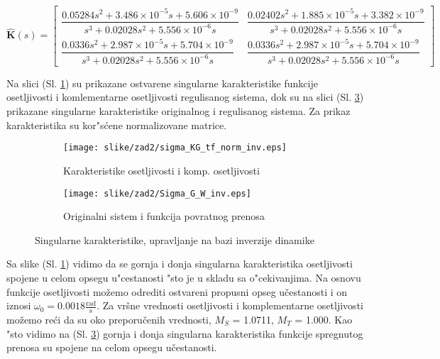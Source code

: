 \documentclass[a4paper,11pt]{article}
\theoremstyle{definition} \newtheorem{deff}{Definicija}[section]
\theoremstyle{definition} \newtheorem{prim}[deff]{Primer}
\theoremstyle{plain} \newtheorem{teor}[deff]{Teorema}
\begin{document}
			
			\begin{equation}
				\hat{\textbf{K}}(s) = \begin{bmatrix} \dfrac{{0.05284s^2 + 3.486 \times 10^{-5}s + 5.606 \times 10^{-9}}}{{s^3 + 0.02028s^2 + 5.556 \times 10^{-6}s}} & \dfrac{{0.02402s^2 + 1.885 \times 10^{-5}s + 3.382 \times 10^{-9}}}{{s^3 + 0.02028s^2 + 5.556 \times 10^{-6}s}} \\[1em]
					\dfrac{{0.0336s^2 + 2.987 \times 10^{-5}s + 5.704 \times 10^{-9}}}{{s^3 + 0.02028s^2 + 5.556 \times 10^{-6}s}} & \dfrac{{0.0336s^2 + 2.987 \times 10^{-5}s + 5.704 \times 10^{-9}}}{{s^3 + 0.02028s^2 + 5.556 \times 10^{-6}s}} \end{bmatrix}
			\end{equation}
			
			\clearpage
			
			Na slici (Sl. \ref{fig:sigmaINV}) su prikazane ostvarene singularne karakteristike funkcije osetljivosti i komlementarne osetljivosti regulisanog sistema, dok su na slici (Sl. \ref{fig:sigmaG_W_INV}) prikazane singularne karakteristike originalnog i regulisanog sistema. Za prikaz karakteristika su kor"s\'cene normalizovane matrice.
			
			\hspace{2cm}
			
			\begin{figure}[h]
				\centering
				\begin{subfigure}{0.6\linewidth}
					\centering
					\texttt{[image: slike/zad2/sigma\_KG\_tf\_norm\_inv.eps]}
					\caption{Karakteristike osetljivosti i komp. osetljivosti}
					\label{fig:sigmaINV}
				\end{subfigure}
				\hfill
				\begin{subfigure}{0.6\linewidth}
					\centering
					\texttt{[image: slike/zad2/Sigma\_G\_W\_inv.eps]}
					\caption{Originalni sistem i funkcija povratnog prenosa}
					\label{fig:sigmaG_W_INV}
				\end{subfigure}
				\caption{Singularne karakteristike, upravljanje na bazi inverzije dinamike}
			\end{figure}
			
			\hspace{2cm}
			
			Sa slike (Sl. \ref{fig:sigmaINV}) vidimo da se gornja i donja singularna karakteristika osetljivosti spojene u celom opsegu u"cestanosti "sto je u skladu sa o"cekivanjima. Na osnovu funkcije osetljivosti možemo odrediti ostvareni propusni opseg učestanosti i on iznosi $\omega_0 = 0.0018 \frac{\text{rad}}{\text{s}}$. Za vršne vrednosti osetljivosti i komplementarne osetljivosti možemo reći da su oko preporučenih vrednosti, $M_S$ = 1.0711, $M_T$ = 1.000. Kao "sto vidimo na (Sl. \ref{fig:sigmaG_W_INV}) gornja i donja singularna karakteristika funkcije spregnutog prenosa su spojene na celom opsegu učestanosti.
			
\end{document}
